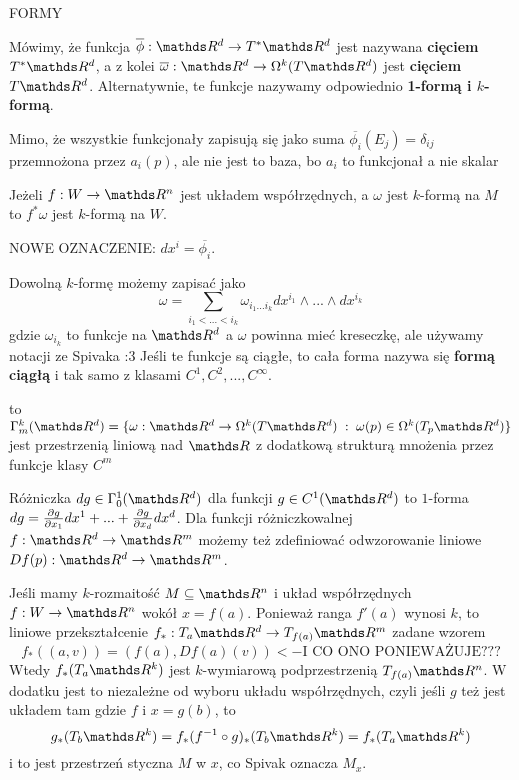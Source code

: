 \documentclass{article}
\begin{document}
{\large\color{def}FORMY}
\begin{description}
    \item Mówimy, że funkcja $\overline{\phi}:\R^d\to T^*\R^d$ jest nazywana \textbf{cięciem} $T^*\R^d$, a z kolei $\overline{\omega}:\R^d\to\Omega^k(T\R^d)$ jest \textbf{cięciem $T\R^d$}. Alternatywnie, te funkcje nazywamy odpowiednio \textbf{\color{acc}1-formą i $k$-formą}.   
    \item Mimo, że wszystkie funkcjonały zapisują się jako suma $\overline{\phi_i}(E_j)=\delta_{ij}$ przemnożona przez $a_i(p)$, ale nie jest to baza, bo $a_i$ to funkcjonał a nie skalar
    \item Jeżeli $f:W\to \R^n$ jest układem współrzędnych, a $\omega$ jest $k$-formą na $M$ to $f^*\omega$ jest $k$-formą na $W$.
    \item {\color{def}NOWE OZNACZENIE: $dx^i=\overline{\phi_i}$.}
    \item Dowolną $k$-formę możemy zapisać jako $$\omega=\sum\limits_{i_1<...<i_k}\omega_{i_1...i_k}dx^{i_1}\land ...\land dx^{i_k}$$ gdzie $\omega_{i_k}$ to funkcje na $\R^d$ a $\omega$ powinna mieć kreseczkę, ale używamy notacji ze Spivaka :3 Jeśli te funkcje są ciągłe, to cała forma nazywa się \textbf{\color{acc}formą ciągłą} i tak samo z klasami $C^1,C^2,...,C^\infty$.
    \item [Przestrzeń $k$-form klasy $C^m$] to $\Gamma^k_m(\R^d)=\{\omega:\R^d\to\Omega^k(T\R^d)\;:\;\omega(p)\in\Omega^k(T_p\R^d)\}$ jest przestrzenią liniową nad $\R$ z dodatkową strukturą mnożenia przez funkcje klasy $C^m$
\end{description}

{\color{def}Różniczka $dg\in\Gamma^1_0(\R^d)$} dla funkcji $g\in C^1(\R^d)$ to $1$-forma $dg={\partial g\over \partial x_1}dx^1+...+{\partial g\over \partial x_d}dx^d$. Dla funkcji różniczkowalnej $f:\R^d\to\R^m$ możemy też zdefiniować odwzorowanie liniowe $Df(p):\R^d\to\R^m$.

Jeśli mamy $k$-rozmaitość $M\subseteq\R^n$ i układ współrzędnych $f:W\to\R^n$ wokół $x=f(a)$. Ponieważ ranga $f'(a)$ wynosi $k$, to liniowe przekształcenie $f_*:T_a\R^d\to T_{f(a)}\R^m$ zadane wzorem
$$f_*((a,v))=(f(a), Df(a)(v)) <- \text{I CO ONO PONIEWAŻUJE???}$$
Wtedy $f_*(T_a\R^k)$ jest $k$-wymiarową podprzestrzenią $T_{f(a)}\R^n$. W dodatku jest to niezależne od wyboru układu współrzędnych, czyli jeśli $g$ też jest układem tam gdzie $f$ i $x=g(b)$, to 
$$g_*(T_b\R^k)=f_*(f^{-1}\circ g)_*(T_b\R^k)=f_*(T_a\R^k)$$
i to jest przestrzeń styczna $M$ w $x$, co Spivak oznacza $M_x$.
\smallskip
\end{document}
